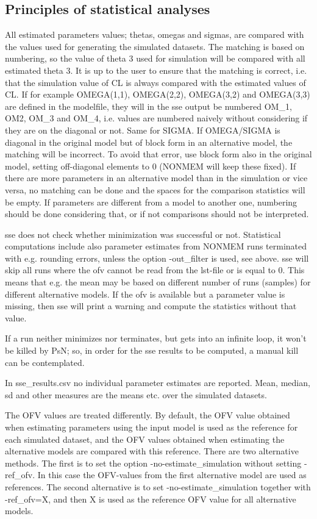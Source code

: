 \subsection{Principles of statistical analyses}

All estimated parameters values; thetas, omegas and sigmas, are compared with the values used for generating the simulated datasets. The matching is based on numbering, so the value of theta 3 used for simulation will be compared with all estimated theta 3. It is up to the user to ensure that the matching is correct, i.e. that the simulation value of CL is always compared with the estimated values of CL. 
If for example OMEGA(1,1), OMEGA(2,2), OMEGA(3,2) and OMEGA(3,3) are defined in the modelfile, they will in the sse output be numbered OM\_1, OM2, OM\_3 and OM\_4, i.e. values are numbered naively without considering if they are on the diagonal or not. Same for SIGMA. 
If OMEGA/SIGMA is diagonal in the original model but of block form in an alternative model, the matching will be incorrect. To avoid that error, use block form also in the original model, setting off-diagonal elements to 0 (NONMEM will keep these fixed). If there are more parameters in an alternative model than in the simulation or vice versa, no matching can be done and the spaces for the comparison statistics will be empty. If parameters are different from a model to another one, numbering should be done considering that, or if not comparisons should not be interpreted. 

sse does not check whether minimization was successful or not. Statistical computations include also parameter estimates from NONMEM runs terminated with e.g. rounding errors, unless the option -out\_filter is used, see above. sse will skip all runs where the ofv cannot be read from the lst-file  or is equal to 0. This means that e.g. the mean may be based on different number of runs (samples) for different alternative models. If the ofv is available but a parameter value is missing, then sse will print a warning and compute the statistics without that value. 

If a run neither minimizes nor terminates, but gets into an infinite loop, it won't be killed by PsN; so, in order for the sse results to be computed, a manual kill can be contemplated.

In sse\_results.csv no individual parameter estimates are reported. Mean, median, sd and other measures are the means etc. over the simulated datasets.

The OFV values are treated differently. By default, the OFV value obtained when estimating parameters using the input model is used as the reference for each simulated dataset, and the OFV values obtained when estimating the alternative models are compared with this reference. There are two alternative methods. The first is to set the option -no-estimate\_simulation without setting -ref\_ofv. In this case the OFV-values from the first alternative model are used as references. The second alternative is to set -no-estimate\_simulation together with -ref\_ofv=X, and then X is used as the reference OFV value for all alternative models.



